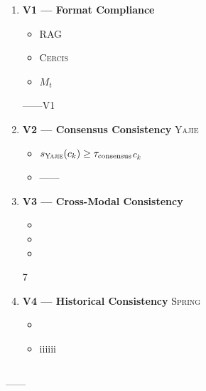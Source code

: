 \documentclass[12pt,a4paper]{article}
\theoremstyle{remark}
\newcommand{\Spring}{\textsc{Spring}}
\newcommand{\Yajie}{\textsc{Yajie}}
\newcommand{\Cercis}{\textsc{Cercis}}
\begin{document}
\begin{enumerate}[label=\textbf{V\arabic*},leftmargin=*,itemsep=5pt]
    \item \textbf{V1 — Format Compliance}
    
    \begin{itemize}[nosep]
        \item RAG
        \item \Cercis{}
        \item $M_t$
    \end{itemize}
    ——V1

    \item \textbf{V2 — Consensus Consistency}
    \Yajie{}
    \begin{itemize}[nosep]
        \item $s_{\Yajie}(c_k) \geq \tau_{\text{consensus}}$$c_k$
        \item ——
        
    \end{itemize}

    \item \textbf{V3 — Cross-Modal Consistency}
    
    \begin{itemize}[nosep]
        \item 
        \item 
        \item 
    \end{itemize}
    7

    \item \textbf{V4 — Historical Consistency}
    \Spring{}
    \begin{itemize}[nosep]
        \item 
        \item iiiiii
    \end{itemize}
\end{enumerate}

\subsection{}

——
\end{document}
